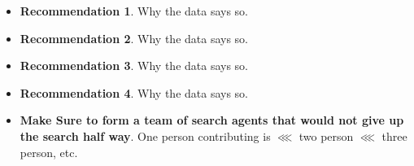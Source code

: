 \documentclass[12pt, letterpaper]{article}  %
\theoremstyle{definition}
\theoremstyle{remark}
\theoremstyle{plain}
\begin{document}


\begin{itemize}
\item \textbf{Recommendation 1}.  Why the data says so.
\item \textbf{Recommendation 2}.  Why the data says so.
\item \textbf{Recommendation 3}.  Why the data says so.
\item \textbf{Recommendation 4}.  Why the data says so.
\item \textbf{Make Sure to form a team of search agents that would not give up the search half way}.  One person contributing is $\lll$ two person $\lll$ three person, etc.
\end{itemize}






\end{document}
